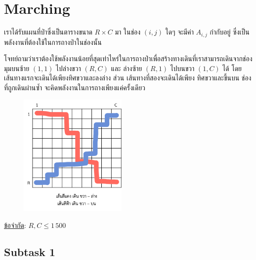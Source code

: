 \documentclass[12pt]{article}
\begin{document}
\newpage







































\section{Marching}

เราได้รับแผนที่ป่าซึ่งเป็นตารางขนาด $R \times C$ มา ในช่อง $(i, j)$ ใดๆ จะมีค่า $A_{i,j}$ กำกับอยู่ ซึ่งเป็นพลังงานที่ต้องใช้ในการถางป่าในช่องนั้น 

โจทย์ถามว่าเราต้องใช้พลังงานน้อยที่สุดเท่าไหร่ในการถางป่าเพื่อสร้างทางเดินที่เราสามารถเดินจากช่องมุมบนซ้าย $(1, 1)$ ไปล่างขวา $(R, C)$ และ ล่างซ้าย $(R, 1)$ ไปบนขวา $(1, C)$ ได้ โดย เส้นทางแรกจะเดินได้เพียงทิศขวาและลงล่าง ส่วน เส้นทางที่สองจะเดินได้เพียง ทิศขวาและขึ้นบน ช่องที่ถูกเดินผ่านซ้ำ จะคิดพลังงานในการถางเพียงแค่ครั้งเดียว

\begin{figure}[h]
  \centering
  \includegraphics[height=6cm]{./images/marching1.png}
\end{figure}

\underline{ข้อจำกัด}: $R, C \leq 1\,500$

\subsection{Subtask 1}
\end{document}
